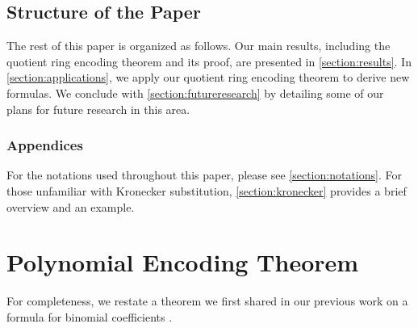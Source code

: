 \documentclass[11pt,reqno]{article}
\theoremstyle{plain}
\theoremstyle{definition}
\begin{document}
\subsection{Structure of the Paper}
The rest of this paper is organized as follows.  Our main results, including the quotient ring encoding theorem and its proof, are presented in \cref{section:results}. In \cref{section:applications}, we apply our quotient ring encoding theorem to derive new formulas. We conclude with \cref{section:futureresearch} by detailing some of our plans for future research in this area.

\subsubsection{Appendices}
For the notations used throughout this paper, please see \cref{section:notations}. For those unfamiliar with Kronecker substitution, \cref{section:kronecker} provides a brief overview and an example.

\section{Polynomial Encoding Theorem}
For completeness, we restate a theorem we first shared in our previous work on a formula for binomial coefficients \cite{shunia2023simple}.
\end{document}
